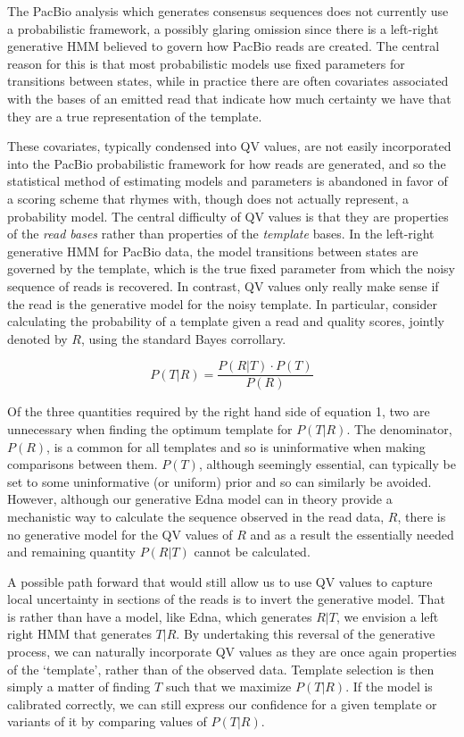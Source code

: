 \documentclass[fleqn,10pt]{SelfArx} %
\begin{document}
The PacBio analysis which generates consensus sequences does not currently use a probabilistic framework, a possibly glaring omission since there is a left-right generative HMM believed to govern how PacBio reads are created.  The central reason for this is that most probabilistic models use fixed parameters for transitions between states, while in practice there are often covariates associated with the bases of an emitted read that indicate how much certainty we have that they are a true representation of the template.

These covariates, typically condensed into QV values, are not easily incorporated into the PacBio probabilistic framework for how reads are generated, and so the statistical method of estimating models and parameters is abandoned in favor of a scoring scheme that rhymes with, though does not actually represent, a probability model.  The central difficulty of QV values is that they are properties of the \textit{read bases} rather than properties of the \textit{template} bases.  In the left-right generative HMM for PacBio data, the model transitions between states are governed by the template, which is the true fixed parameter from which the noisy sequence of reads is recovered.  In contrast, QV values only really make sense if the read is the generative model for the noisy template.  In particular, consider calculating the probability of a template given a read and quality scores, jointly denoted by $R$, using the standard Bayes corrollary.

\begin{dmath}
P(T|R) = \frac{P(R|T) \cdot P(T)}{P(R)}
\end{dmath}

Of the three quantities required by the right hand side of equation 1, two are unnecessary when finding the optimum template for $P(T|R)$.  The denominator, $P(R)$, is a common for all templates and so is uninformative when making comparisons between them. $P(T)$, although seemingly essential, can typically be set to some uninformative (or uniform) prior and so can similarly be avoided.  However, although our generative Edna model can in theory provide a mechanistic way to calculate the sequence observed in the read data, $R$, there is no generative model for the QV values of $R$ and as a result the essentially needed and remaining quantity $P(R|T)$ cannot be calculated.

A possible path forward that would still allow us to use QV values to capture local uncertainty in sections of the reads is to invert the generative model.  That is rather than have a model, like Edna, which generates $R|T$, we envision a left right HMM that generates $T|R$.  By undertaking this reversal of the generative process, we can naturally incorporate QV values as they are once again properties of the `template', rather than of the observed data.  Template selection is then simply a matter of finding $T$ such that we maximize $P(T|R)$.  If the model is calibrated correctly, we can still express our confidence for a given template or variants of it by comparing values of $P(T|R)$.
\end{document}
